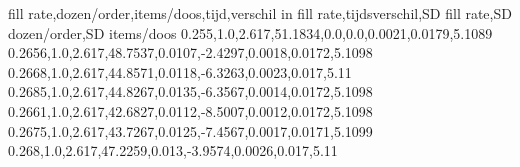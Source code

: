 fill rate,dozen/order,items/doos,tijd,verschil in fill rate,tijdsverschil,SD fill rate,SD dozen/order,SD items/doos
0.255,1.0,2.617,51.1834,0.0,0.0,0.0021,0.0179,5.1089
0.2656,1.0,2.617,48.7537,0.0107,-2.4297,0.0018,0.0172,5.1098
0.2668,1.0,2.617,44.8571,0.0118,-6.3263,0.0023,0.017,5.11
0.2685,1.0,2.617,44.8267,0.0135,-6.3567,0.0014,0.0172,5.1098
0.2661,1.0,2.617,42.6827,0.0112,-8.5007,0.0012,0.0172,5.1098
0.2675,1.0,2.617,43.7267,0.0125,-7.4567,0.0017,0.0171,5.1099
0.268,1.0,2.617,47.2259,0.013,-3.9574,0.0026,0.017,5.11
